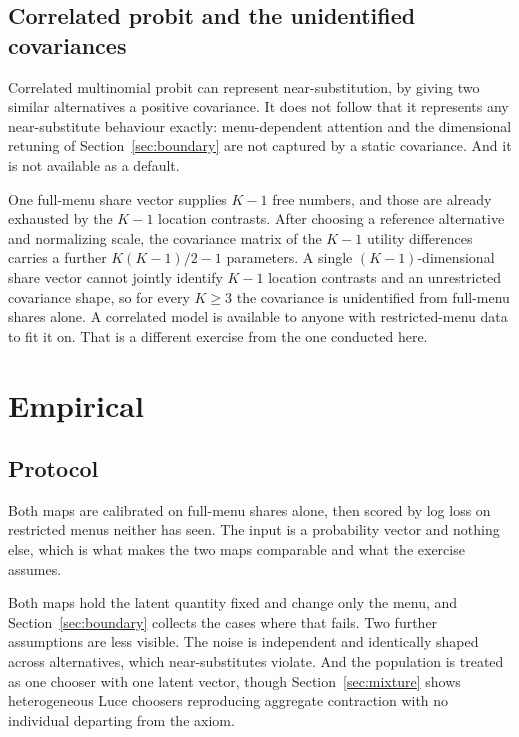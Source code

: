 \documentclass[11pt]{article}
\begin{document}
\subsection{Correlated probit and the unidentified covariances}
\label{sec:probit}

Correlated multinomial probit can represent near-substitution, by giving two similar
alternatives a positive covariance. It does not follow that it represents any near-substitute
behaviour exactly: menu-dependent attention and the dimensional retuning of
Section~\ref{sec:boundary} are not captured by a static covariance. And it is not available as a
default.

One full-menu share vector supplies $K-1$ free numbers, and those are already exhausted by the $K-1$ location
contrasts. After choosing a reference alternative and normalizing scale, the covariance matrix
of the $K-1$ utility differences carries a further $K(K-1)/2 - 1$ parameters. A single
$(K-1)$-dimensional share vector cannot jointly identify $K-1$ location contrasts and an
unrestricted covariance shape, so for every $K \ge 3$ the covariance is unidentified from
full-menu shares alone. A correlated model is available to anyone with
restricted-menu data to fit it on. That is a different exercise from the one conducted here.

\section{Empirical}
\label{sec:empirical}

\subsection{Protocol}
\label{sec:design}

Both maps are calibrated on full-menu shares alone, then scored by log
loss on restricted menus neither has seen. The input is a probability vector and nothing else,
which is what makes the two maps comparable and what the exercise assumes.

Both maps hold the latent quantity fixed and change only the menu, and
Section~\ref{sec:boundary} collects the cases where that fails. Two further assumptions are less
visible. The noise is independent and identically shaped across alternatives, which
near-substitutes violate. And the population is treated as one chooser with one latent vector,
though Section~\ref{sec:mixture} shows heterogeneous Luce choosers reproducing aggregate
contraction with no individual departing from the axiom.
\end{document}
